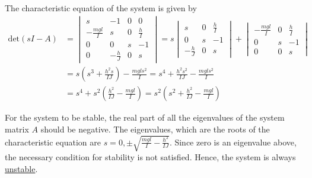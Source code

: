 The characteristic equation of the system is given by
\begin{align*}
    \text{det}(sI-A)
     & =
    \begin{vmatrix}
        s                & -1           & 0 & 0           \\
        -\frac{m g l}{I} & s            & 0 & \frac{h}{I} \\
        0                & 0            & s & -1          \\
        0                & -\frac{h}{J} & 0 & s
    \end{vmatrix}
    =
    s
    \begin{vmatrix}
        s            & 0 & \frac{h}{I} \\
        0            & s & -1          \\
        -\frac{h}{J} & 0 & s
    \end{vmatrix}
    +
    \begin{vmatrix}
        -\frac{m g l}{I} & 0 & \frac{h}{I} \\
        0                & s & -1          \\
        0                & 0 & s
    \end{vmatrix}
    \\ & =
    s
    \left( s^3 + \frac{h^2 s}{I J} \right)
    -
    \frac{m g l s^2}{I}
    =
    s^4 + \frac{h^2 s^2}{I J} - \frac{m g l s^2}{I}
    \\ & =
    s^4 + s^2 \left( \frac{h^2}{I J} - \frac{m g l}{I} \right)
    =
    s^2 \left( s^2 + \frac{h^2}{I J} - \frac{m g l}{I} \right)
\end{align*}

For the system to be stable, the real part of all the eigenvalues of the system matrix \( A \) should be negative.
The eigenvalues, which are the roots of the characteristic equation are \( s=0, \pm \sqrt{\frac{m g l}{I}-\frac{h^2}{I J}} \).
Since zero is an eigenvalue above, the necessary condition for stability is not satisfied.
Hence, the system is always \underline{unstable}.
